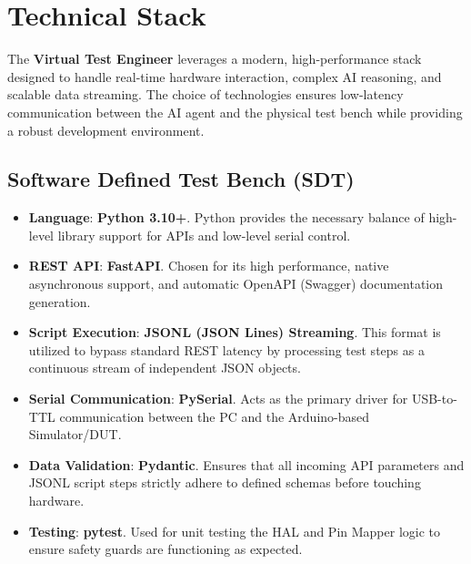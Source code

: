 \documentclass[conference]{IEEEtran}
\begin{document}
\section{Technical Stack}
The \textbf{Virtual Test Engineer} leverages a modern, high-performance stack designed to handle real-time hardware interaction, complex AI reasoning, and scalable data streaming. The choice of technologies ensures low-latency communication between the AI agent and the physical test bench while providing a robust development environment.

\subsection{Software Defined Test Bench (SDT)}
\begin{itemize}
    \item \textbf{Language}: \textbf{Python 3.10+}. Python provides the necessary balance of high-level library support for APIs and low-level serial control.
    \item \textbf{REST API}: \textbf{FastAPI}. Chosen for its high performance, native asynchronous support, and automatic OpenAPI (Swagger) documentation generation.
    \item \textbf{Script Execution}: \textbf{JSONL (JSON Lines) Streaming}. This format is utilized to bypass standard REST latency by processing test steps as a continuous stream of independent JSON objects.
    \item \textbf{Serial Communication}: \textbf{PySerial}. Acts as the primary driver for USB-to-TTL communication between the PC and the Arduino-based Simulator/DUT.
    \item \textbf{Data Validation}: \textbf{Pydantic}. Ensures that all incoming API parameters and JSONL script steps strictly adhere to defined schemas before touching hardware.
    \item \textbf{Testing}: \textbf{pytest}. Used for unit testing the HAL and Pin Mapper logic to ensure safety guards are functioning as expected.
\end{itemize}
\end{document}
